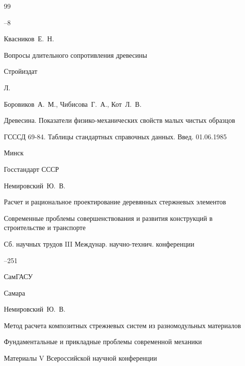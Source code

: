 \begin{thebibliography}{99}

--8






\by Квасников~Е.~Н.

\book Вопросы длительного сопротивления древесины


\publ Стройиздат

\publaddr Л.







\by Боровиков~А.~М., Чибисова~Г.~А., Кот~Л.~В.

\book Древесина. Показатели физико-механичес\-ких свойств малых чистых образцов 

\bookinfo ГСССД 69-84. Таблицы стандартных справочных данных. Введ.  01.06.1985


\publaddr Минск

\publ Госстандарт СССР









\by Немировский~Ю.~В.

\paper Расчет и рациональное проектирование деревянных стержневых элементов 

\inbook Современные проблемы совершенствования и развития конструкций в строительстве и транспорте 

\bookinfo Сб. научных трудов III Междунар. научно-технич. конференции


--251

\publ СамГАСУ

\publaddr Самара






\by Немировский~Ю.~В.

\paper Метод расчета композитных стрежневых систем из разномодульных материалов

\inbook Фундаментальные и прикладные проблемы современной механики

\bookinfo  Материалы V Всероссийской научной конференции


\end{thebibliography}
